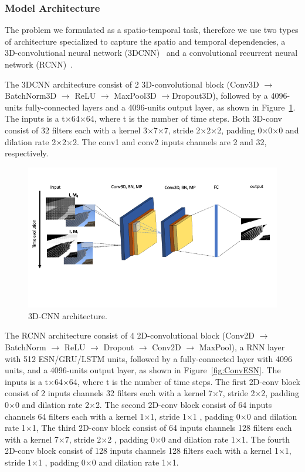 \documentclass{WitsPhysicsReport}
\begin{document}
\subsubsection{Model Architecture}
The problem we formulated as a spatio-temporal task, therefore we use two types of architecture specialized to capture the spatio and temporal dependencies, a 3D-convolutional neural network (3DCNN)~\cite{tran2015learning, ji20123d, karpathy2014large} and a convolutional recurrent neural network (RCNN)~\cite{ji20123d, wang2016cnn}. 

The 3DCNN architecture consist of 2 3D-convolutional block (Conv3D
$\rightarrow$
BatchNorm3D
$\rightarrow$
ReLU
$\rightarrow$
MaxPool3D
$\rightarrow
$Dropout3D), followed by a 4096-units fully-connected layers and a 4096-units output layer, as shown in Figure~\ref{fig:3dCNN}.  The inputs is a t$\times$64$\times$64, where t is the number of time steps. Both 3D-conv consist of 32 filters each with a kernel 3$\times$7$\times$7, stride 2$\times$2$\times$2, padding 0$\times$0$\times$0 and dilation rate 2$\times$2$\times$2. The conv1 and conv2 inputs channels are 2 and 32, respectively.



\begin{figure}[H]
\centering
\includegraphics[width=1\textwidth]{Figure/3dcnn.png}
\caption{3D-CNN architecture.}
\label{fig:3dCNN}
\end{figure}


The RCNN architecture consist of 4 2D-convolutional block (Conv2D
$\rightarrow$
BatchNorm
$\rightarrow$
ReLU
$\rightarrow$
Dropout
$\rightarrow$
Conv2D
$\rightarrow$
MaxPool), a RNN layer with 512 ESN/GRU/LSTM units, followed by a fully-connected layer with 4096 units, and a 4096-units output layer, as shown in Figure~\ref{fig:ConvESN}. The inputs is a t$\times$64$\times$64, where t is the number of time steps. The first 2D-conv block consist of 2 inputs channels  32 filters each with a kernel 7$\times$7, stride 2$\times$2, padding 0$\times$0 and dilation rate 2$\times$2.  The second 2D-conv block consist of 64 inputs channels  64 filters each with a kernel 1$\times$1, stride 1$\times$1 , padding 0$\times$0 and dilation rate 1$\times$1, The third 2D-conv block consist of 64 inputs channels  128 filters each with a kernel 7$\times$7, stride 2$\times$2 , padding 0$\times$0 and dilation rate 1$\times$1. The fourth 2D-conv block consist of 128 inputs channels  128 filters each with a kernel 1$\times$1, stride 1$\times$1 , padding 0$\times$0 and dilation rate 1$\times$1.
\end{document}
